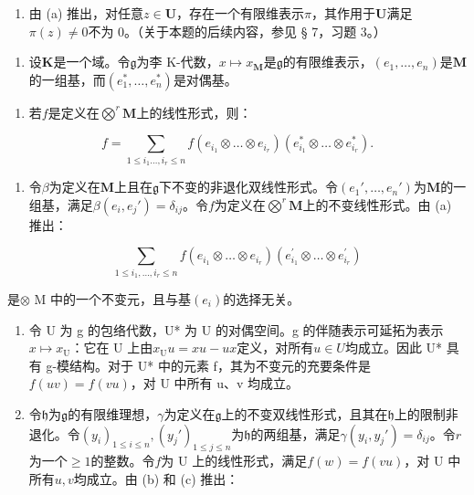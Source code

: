 \begin{enumerate}
\def\labelenumi{(\alph{enumi})}
\setcounter{enumi}{1}
\tightlist
\item
  由 (a) 推出，对任意\(z \in \mathbf{U}\)，存在一个有限维表示\(\pi\)，其作用于\(\mathbf{U}\)满足\(\pi(z) \neq 0\)不为 0。（关于本题的后续内容，参见 § 7，习题 3。）
\end{enumerate}

\begin{enumerate}
\def\labelenumi{\arabic{enumi}.}
\setcounter{enumi}{5}
\tightlist
\item
 设\(\mathbf{K}\)是一个域。令\(\mathfrak{g}\)为李 K-代数，\(x \mapsto x_{\mathbf{M}}\)是\(\mathfrak{g}\)的有限维表示，\((e_1, \ldots, e_n)\)是\(\mathbf{M}\)的一组基，而\((e_1^*, \ldots, e_n^*)\)是对偶基。
\end{enumerate}

\begin{enumerate}
\def\labelenumi{(\alph{enumi})}
\tightlist
\item
  若\(f\)是定义在\(\bigotimes^{r} \mathbf{M}\)上的线性形式，则：
\end{enumerate}

\[
f = \sum_ {1 \leqslant i _ {1} \dots , i _ {r} \leqslant n} f (e _ {i _ {1}} \otimes \dots \otimes e _ {i _ {r}}) (e _ {i _ {1}} ^ {*} \otimes \dots \otimes e _ {i _ {r}} ^ {*}).
\]

\begin{enumerate}
\def\labelenumi{(\alph{enumi})}
\setcounter{enumi}{1}
\tightlist
\item
  令\(\beta\)为定义在\(\mathbf{M}\)上且在\(\mathfrak{g}\)下不变的非退化双线性形式。令\((e_1', \ldots, e_n')\)为\(\mathbf{M}\)的一组基，满足\(\beta(e_i, e_j') = \delta_{ij}\)。令\(f\)为定义在\(\bigotimes^r \mathbf{M}\)上的不变线性形式。由 (a) 推出：
\end{enumerate}

\[
\sum_ {1 \leqslant i _ {1}, \dots , i _ {r} \leqslant n} f (e _ {i _ {1}} \otimes \dots \otimes e _ {i _ {r}}) (e _ {i _ {1}} ^ {\prime} \otimes \dots \otimes e _ {i _ {r}} ^ {\prime})
\]

是\(\otimes\) M 中的一个不变元，且与基\((e_i)\)的选择无关。

\begin{enumerate}
\def\labelenumi{(\alph{enumi})}
\setcounter{enumi}{2}
\item
  令 U 为 g 的包络代数，U* 为 U 的对偶空间。g 的伴随表示可延拓为表示\(x \mapsto x_{\mathrm{U}}\)：它在 U 上由\(x_{\mathrm{U}}u = xu - ux\)定义，对所有\(u \in U\)均成立。因此 U* 具有 g-模结构。对于 U* 中的元素 f，其为不变元的充要条件是\(f(uv) = f(vu)\)，对 U 中所有 u、v 均成立。
\item
  令\(\mathfrak{h}\)为\(\mathfrak{g}\)的有限维理想，\(\gamma\)为定义在\(\mathfrak{g}\)上的不变双线性形式，且其在\(\mathfrak{h}\)上的限制非退化。令\((y_i)_{1\leq i\leq n}, (y_j')_{1\leq j\leq n}\)为\(\mathfrak{h}\)的两组基，满足\(\gamma(y_i,y_j') = \delta_{ij}\)。令\(r\)为一个\(\geqslant 1\)的整数。令\(f\)为 U 上的线性形式，满足\(f(w) = f(vu)\)，对 U 中所有\(u,v\)均成立。由 (b) 和 (c) 推出：
\end{enumerate}

